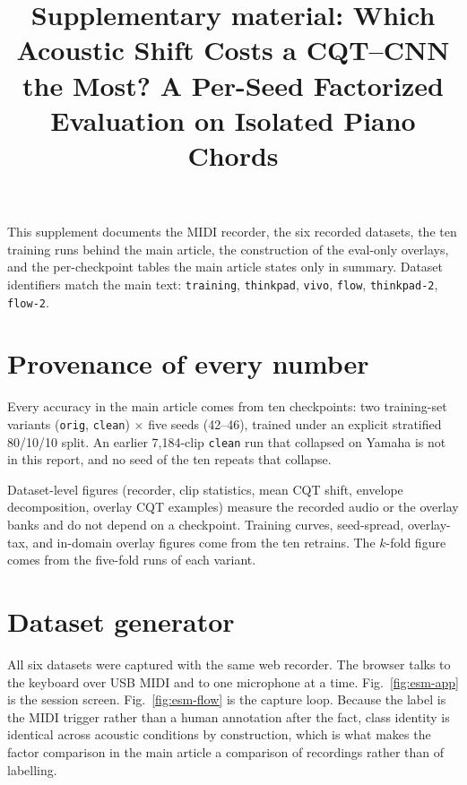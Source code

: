 \documentclass[pdflatex,sn-mathphys-num]{sn-jnl}
\begin{document}
\title[Supplementary material: Which acoustic shift costs a CQT--CNN the most]{Supplementary material: Which Acoustic Shift Costs a CQT--CNN the Most? A Per-Seed Factorized Evaluation on Isolated Piano Chords}

\author*[1]{ }
\author[1]{ }

\maketitle

This supplement documents the MIDI recorder, the six recorded datasets, the ten training runs behind the main article, the construction of the eval-only overlays, and the per-checkpoint tables the main article states only in summary. Dataset identifiers match the main text: \texttt{training}, \texttt{thinkpad}, \texttt{vivo}, \texttt{flow}, \texttt{thinkpad-2}, \texttt{flow-2}.

\section{Provenance of every number}\label{sec:provenance}

Every accuracy in the main article comes from ten checkpoints: two training-set variants (\texttt{orig}, \texttt{clean}) $\times$ five seeds (42--46), trained under an explicit stratified 80/10/10 split. An earlier 7{,}184-clip \texttt{clean} run that collapsed on Yamaha is not in this report, and no seed of the ten repeats that collapse.

Dataset-level figures (recorder, clip statistics, mean CQT shift, envelope decomposition, overlay CQT examples) measure the recorded audio or the overlay banks and do not depend on a checkpoint. Training curves, seed-spread, overlay-tax, and in-domain overlay figures come from the ten retrains. The $k$-fold figure comes from the five-fold runs of each variant.

\section{Dataset generator}\label{sec:generator}

All six datasets were captured with the same web recorder. The browser talks to the keyboard over USB MIDI and to one microphone at a time. Fig.~\ref{fig:esm-app} is the session screen. Fig.~\ref{fig:esm-flow} is the capture loop. Because the label is the MIDI trigger rather than a human annotation after the fact, class identity is identical across acoustic conditions by construction, which is what makes the factor comparison in the main article a comparison of recordings rather than of labelling.
\end{document}
